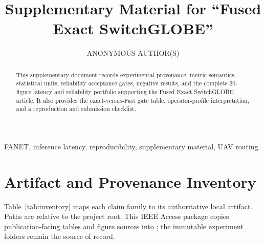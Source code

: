 \documentclass{ieeeaccess}
\begin{document}
\title{Supplementary Material for ``Fused Exact SwitchGLOBE''}
\author{\uppercase{Anonymous Author(s)}}
\address[1]{Affiliation withheld for double-blind draft preparation}
\begin{abstract}
This supplementary document records experimental provenance, metric semantics, statistical units, reliability acceptance gates, negative results, and the complete 20-figure latency and reliability portfolio supporting the Fused Exact SwitchGLOBE article. It also provides the exact-versus-Fast gate table, operator-profile interpretation, and a reproduction and submission checklist.
\end{abstract}
\begin{keywords}
FANET, inference latency, reproducibility, supplementary material, UAV routing.
\end{keywords}
\titlepgskip=-21pt
\maketitle

\section{Artifact and Provenance Inventory}

Table~\ref{tab:inventory} maps each claim family to its authoritative local artifact. Paths are relative to the project root. This IEEE Access package copies publication-facing tables and figure sources into \texttt{}; the immutable experiment folders remain the source of record.
\end{document}
